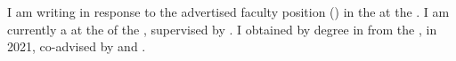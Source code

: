 I am writing in response to the advertised faculty position (\textbf{\appPosition{}\appJobID}) in the \appDept{} at the \appSchool{}. I am currently a \myTitle{} at the \myDept{} of the \mySchoolShort{}, supervised by \mySuper{}. I obtained by \myDegree{} degree in \myMajor{} from the \myPhDSchool{}, in 2021, co-advised by \myAdvisor{} and \myCoAdvisor{}.

